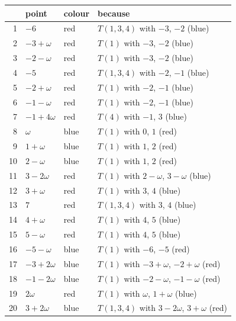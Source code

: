 \begin{center}\small\begin{longtable}{rlll}\toprule & point & colour & because\\\midrule\endhead
1 & $-6$ & red & $T(1,3,4)$ with $-3$, $-2$ (blue)\\
2 & $-3+\omega$ & red & $T(1)$ with $-3$, $-2$ (blue)\\
3 & $-2-\omega$ & red & $T(1)$ with $-3$, $-2$ (blue)\\
4 & $-5$ & red & $T(1,3,4)$ with $-2$, $-1$ (blue)\\
5 & $-2+\omega$ & red & $T(1)$ with $-2$, $-1$ (blue)\\
6 & $-1-\omega$ & red & $T(1)$ with $-2$, $-1$ (blue)\\
7 & $-1+4\omega$ & red & $T(4)$ with $-1$, $3$ (blue)\\
8 & $\omega$ & blue & $T(1)$ with $0$, $1$ (red)\\
9 & $1+\omega$ & blue & $T(1)$ with $1$, $2$ (red)\\
10 & $2-\omega$ & blue & $T(1)$ with $1$, $2$ (red)\\
11 & $3-2\omega$ & red & $T(1)$ with $2-\omega$, $3-\omega$ (blue)\\
12 & $3+\omega$ & red & $T(1)$ with $3$, $4$ (blue)\\
13 & $7$ & red & $T(1,3,4)$ with $3$, $4$ (blue)\\
14 & $4+\omega$ & red & $T(1)$ with $4$, $5$ (blue)\\
15 & $5-\omega$ & red & $T(1)$ with $4$, $5$ (blue)\\
16 & $-5-\omega$ & blue & $T(1)$ with $-6$, $-5$ (red)\\
17 & $-3+2\omega$ & blue & $T(1)$ with $-3+\omega$, $-2+\omega$ (red)\\
18 & $-1-2\omega$ & blue & $T(1)$ with $-2-\omega$, $-1-\omega$ (red)\\
19 & $2\omega$ & red & $T(1)$ with $\omega$, $1+\omega$ (blue)\\
20 & $3+2\omega$ & blue & $T(1,3,4)$ with $3-2\omega$, $3+\omega$ (red)\\
\bottomrule\end{longtable}\end{center}
